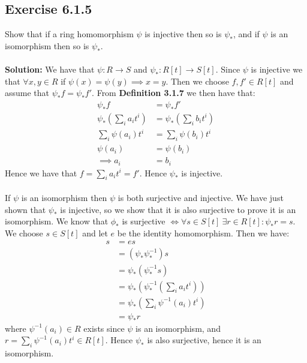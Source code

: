 \documentclass{article}
\begin{document}
\subsection*{Exercise 6.1.5}
Show that if a ring homomorphism $\psi$ is injective then
so is $\psi_*$, and if $\psi$ is an isomorphism then so is $\psi_*$.
\\\\
\textbf{Solution:}
We have that $\psi: R \rightarrow S$ and $\psi_*:R[t] \rightarrow S[t]$. Since $\psi$ is injective we that
$\forall x,y \in R$ if $\psi(x)=\psi(y) \implies x=y$. Then we choose $f, f' \in R[t]$ and assume that
$\psi_*f = \psi_*f'$. From \textbf{Definition 3.1.7} we then have that:
\begin{equation*}
    \begin{aligned}
        \psi_*f &= \psi_*f'\\
        \psi_* \left(\sum_{i} a_it^i \right) &= \psi_* \left(\sum_{i} b_it^i \right)\\
        \sum_{i} \psi(a_i)t^i &= \sum_{i} \psi(b_i)t^i\\
        \psi(a_i) &= \psi(b_i)\\
        \implies a_i &= b_i 
    \end{aligned}
\end{equation*}
Hence we have that $f=\sum_{i}a_it^i = f'$. Hence $\psi_*$ is injective.
\\\\
If $\psi$ is an isomorphism then $\psi$ is both surjective and injective. We have just shown that
$\psi_*$ is injective, so we show that it is also surjective to prove it is an isomorphism. We know that
$\phi_*$ is surjective $\iff \forall s \in S[t] \ \exists r \in R[t]:\psi_*r=s$. We choose $s \in S[t]$ and
let $e$ be the identity homomorphism. Then we have:
\begin{equation*}
    \begin{aligned}
        s&=es\\
        &=(\psi_*\psi_*^{-1})s\\
        &=\psi_*(\psi_*^{-1}s)\\
        &=\psi_*\left(\psi_*^{-1}\left(\sum_{i}a_it^i\right)\right)\\
        &=\psi_*\left(\sum_{i}\psi^{-1}(a_i)t^i\right)\\
        &=\psi_*r
    \end{aligned}
\end{equation*}
where $\psi^{-1}(a_i) \in R$ exists since $\psi$ is an isomorphism, and $r=\sum_{i}\psi^{-1}(a_i)t^i \in R[t]$.
Hence $\psi_*$ is also surjective, hence it is an isomorphism.
\end{document}
